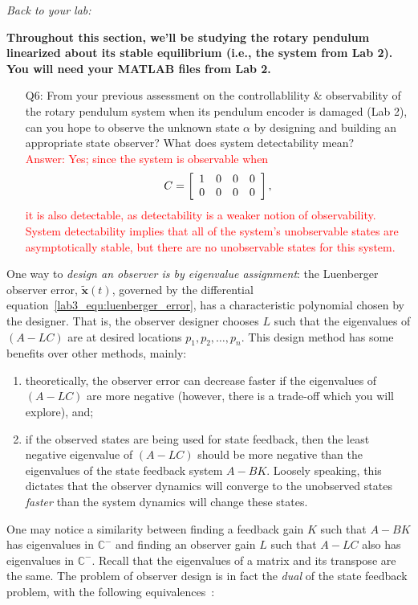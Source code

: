 \documentclass[12pt]{report}
\newcommand\drew[1]{\textcolor{red}{#1}}
\begin{document}
\noindent \emph{Back to your lab:}

\textbf{Throughout this section, we'll be studying the rotary pendulum linearized about its stable equilibrium (i.e., the system from Lab 2). You will need your MATLAB files from Lab 2.}
\begin{enumerate}[Question]
    \item[Q6:] From your previous assessment on the controllablility \& observability of the rotary pendulum system when its pendulum encoder is damaged (Lab 2), can you hope to observe the unknown state $\alpha$ by designing and building an appropriate state observer? What does system detectability mean?\\
          \drew{Answer: Yes; since the system is observable when
              \[C = \left[\begin{array}{c c c c}
                          1 & 0 & 0 & 0 \\
                          0 & 0 & 0 & 0
                      \end{array}\right],\]
              it is also detectable, as detectability is a weaker notion of observability. System detectability implies that all of the system's unobservable states are asymptotically stable, but there are no unobservable states for this system.
          }
\end{enumerate}
One way to \emph{design an observer is by eigenvalue assignment}: the Luenberger observer error, $\tilde{\mathbf{x}}(t)$, governed by the differential equation~\eqref{lab3_equ:luenberger_error}, has a characteristic polynomial chosen by the designer. That is, the observer designer chooses $L$ such that the eigenvalues of $(A-LC)$ are at desired locations $p_1, p_2, \dots, p_n$. This design method has some benefits over other methods, mainly:
\begin{enumerate}
    \item theoretically, the observer error can decrease faster if the eigenvalues of $(A-LC)$ are more negative (however, there is a trade-off which you will explore), and;
    \item if the observed states are being used for state feedback, then the least negative eigenvalue of $(A-LC)$ should be more negative than the eigenvalues of the state feedback system $A-BK$. Loosely speaking, this dictates that the observer dynamics will converge to the unobserved states \emph{faster} than the system dynamics will change these states.
\end{enumerate}
One may notice a similarity between finding a feedback gain $K$ such that $A-BK$ has eigenvalues in $\mathbb{C}^-$ and finding an observer gain $L$ such that $A-LC$ also has eigenvalues in $\mathbb{C}^-$. Recall that the eigenvalues of a matrix and its transpose are the same. The problem of observer design is in fact the \emph{dual} of the state feedback problem, with the following equivalences~\cite{astrom2010feedback}:
\end{document}
